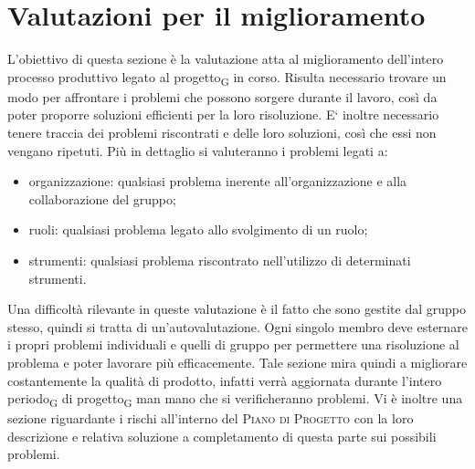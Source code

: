 \section{Valutazioni per il miglioramento}
L'obiettivo di questa sezione è la valutazione atta al miglioramento dell’intero processo produttivo legato al progetto\textsubscript{G} in corso. Risulta necessario trovare un modo per affrontare i problemi che possono sorgere durante il lavoro, così da poter proporre soluzioni efficienti per la loro risoluzione. E` inoltre necessario tenere traccia dei problemi riscontrati e delle loro soluzioni, così che essi non vengano ripetuti. 
Più in dettaglio si valuteranno i problemi legati a:
\begin{itemize}
    \item organizzazione: qualsiasi problema inerente all'organizzazione e alla collaborazione del gruppo;
    \item ruoli: qualsiasi problema legato allo svolgimento di un ruolo;
    \item strumenti: qualsiasi problema riscontrato nell'utilizzo di determinati strumenti.
\end{itemize}

Una difficoltà rilevante in queste valutazione è il fatto che sono gestite dal gruppo stesso, quindi si tratta di un'autovalutazione. Ogni singolo membro deve esternare i propri problemi individuali e quelli di gruppo per permettere una risoluzione al problema e poter lavorare più efficacemente. 
Tale sezione mira quindi a migliorare costantemente la qualità di prodotto, infatti verrà aggiornata durante l'intero periodo\textsubscript{G} di progetto\textsubscript{G} man mano che si verificheranno problemi.
Vi è inoltre una sezione riguardante i  rischi all'interno del \textsc{Piano di Progetto} con la loro descrizione e relativa soluzione a completamento di questa parte sui possibili problemi.
